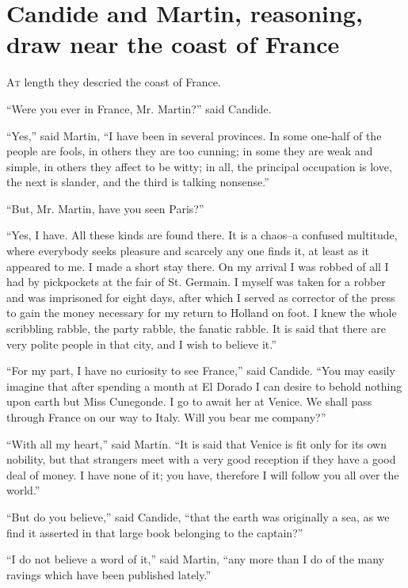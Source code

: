 \vspace{1cm}
\begingroup
\let\clearpage\relax
\chapter{Candide and Martin, reasoning,  draw near the coast of France}
\thispagestyle{pter}
\endgroup
\vspace{-1cm}
\lettrine[lraise=0.1,nindent=0em,slope=-.5em]{A}{t} length they descried the coast of France.

``Were you ever in France, Mr. Martin?'' said Candide.

``Yes,'' said Martin, ``I have been in several provinces. In some one-half of the people are fools, in others they are too cunning; in some they are weak and simple, in others they affect to be witty; in all, the principal occupation is love, the next is slander, and the third is talking nonsense.''

``But, Mr. Martin, have you seen Paris?''

``Yes, I have. All these kinds are found there. It is a chaos--a confused multitude, where everybody seeks pleasure and scarcely any one finds it, at least as it appeared to me. I made a short stay there. On my arrival I was robbed of all I had by pickpockets at the fair of St. Germain. I myself was taken for a robber and was imprisoned for eight days, after which I served as corrector of the press to gain the money necessary for my return to Holland on foot. I knew the whole scribbling rabble, the party rabble, the fanatic rabble. It is said that there are very polite people in that city, and I wish to believe it.''

``For my part, I have no curiosity to see France,'' said Candide. ``You may easily imagine that after spending a month at El Dorado I can desire to behold nothing upon earth but Miss Cunegonde. I go to await her at Venice. We shall pass through France on our way to Italy. Will you bear me company?''

``With all my heart,'' said Martin. ``It is said that Venice is fit only for its own nobility, but that strangers meet with a very good reception if they have a good deal of money. I have none of it; you have, therefore I will follow you all over the world.''

``But do you believe,'' said Candide, ``that the earth was originally a sea, as we find it asserted in that large book belonging to the captain?''

``I do not believe a word of it,'' said Martin, ``any more than I do of the many ravings which have been published lately.''


